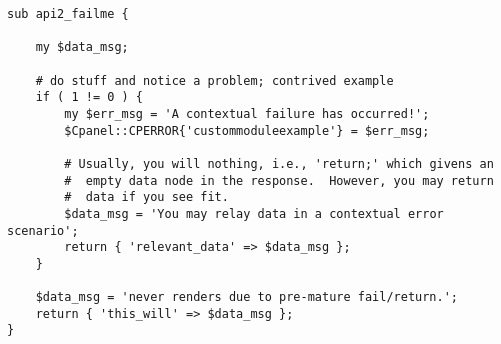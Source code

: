 \begin{verbatim}
sub api2_failme {

    my $data_msg;

    # do stuff and notice a problem; contrived example
    if ( 1 != 0 ) {
        my $err_msg = 'A contextual failure has occurred!';
        $Cpanel::CPERROR{'custommoduleexample'} = $err_msg;

        # Usually, you will nothing, i.e., 'return;' which givens an
        #  empty data node in the response.  However, you may return
        #  data if you see fit.
        $data_msg = 'You may relay data in a contextual error scenario';
        return { 'relevant_data' => $data_msg };
    }

    $data_msg = 'never renders due to pre-mature fail/return.';
    return { 'this_will' => $data_msg };
}
\end{verbatim}

